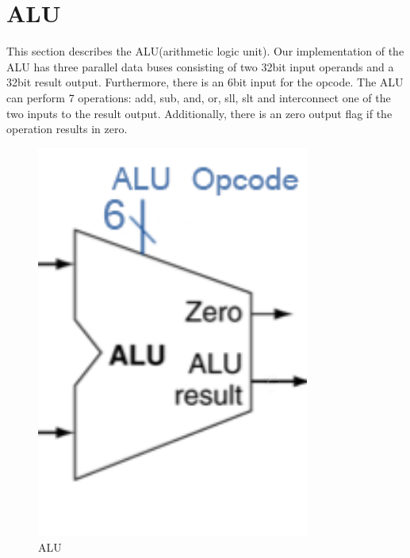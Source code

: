 \section{ALU}
This section describes the ALU(arithmetic logic unit). Our implementation of the ALU has three parallel data buses consisting of two 32bit input operands and a 32bit result output. Furthermore, there is an 6bit input for the opcode. The ALU can perform 7 operations: add, sub, and, or, sll, slt and interconnect one of the two inputs to the result output. Additionally, there is an zero output flag if the operation results in zero.

\begin{figure}[h!]
  \centering
  \includegraphics[width=0.8\textwidth]{figure/alu.png}
  \caption{ALU}
  \label{fig:ALU}
\end{figure}
